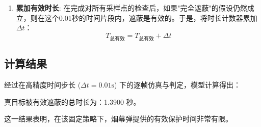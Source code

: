 \documentclass[5pt, withoutpreface,bwprint]{cumcmthesis} %
\begin{document}
\begin{enumerate}
\begin{itemize}
\begin{enumerate}
            
            \item \textbf{累加有效时长}:
            在完成对所有采样点的检查后，如果"完全遮蔽"的假设仍然成立，则在这个0.01秒的时间片段内，遮蔽是有效的。于是，将时长计数器累加$\Delta t$：
                \begin{equation*}
                    T_{\text{总有效}} = T_{\text{总有效}} + \Delta t
                \end{equation*}
           
        \end{enumerate}
    \end{itemize}
\end{enumerate}
\subsection{计算结果}
经过在高精度时间步长 ($\Delta t = 0.01\text{s}$) 下的逐帧仿真与判定，模型计算得出：
\begin{center}
    真目标被有效遮蔽的总时长为：1.3900 秒。
   
\end{center}
这一结果表明，在该固定策略下，烟幕弹提供的有效保护时间非常有限。
\end{document}
